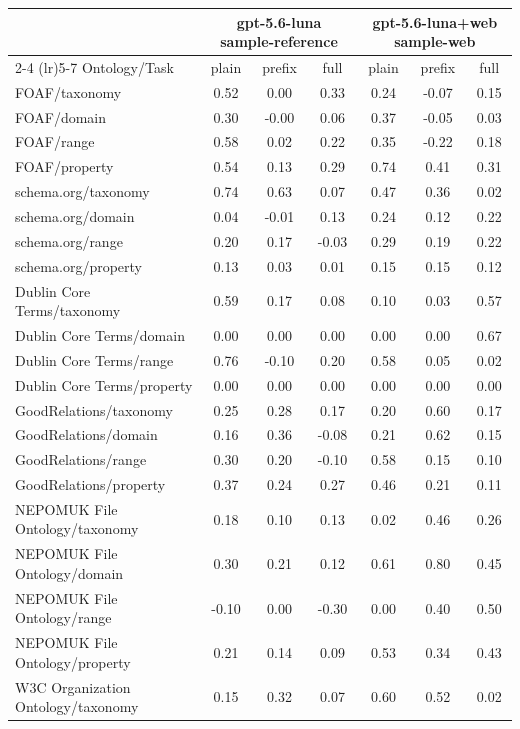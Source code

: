 \begin{tabular}{lcccccc}
\toprule
 & \multicolumn{3}{c}{gpt-5.6-luna sample-reference} & \multicolumn{3}{c}{gpt-5.6-luna+web sample-web} \\
\cmidrule(lr){2-4} \cmidrule(lr){5-7}
Ontology/Task & plain & prefix & full & plain & prefix & full \\
\midrule
FOAF/taxonomy & 0.52 & 0.00 & 0.33 & 0.24 & -0.07 & 0.15 \\
FOAF/domain & 0.30 & -0.00 & 0.06 & 0.37 & -0.05 & 0.03 \\
FOAF/range & 0.58 & 0.02 & 0.22 & 0.35 & -0.22 & 0.18 \\
FOAF/property & 0.54 & 0.13 & 0.29 & 0.74 & 0.41 & 0.31 \\
schema.org/taxonomy & 0.74 & 0.63 & 0.07 & 0.47 & 0.36 & 0.02 \\
schema.org/domain & 0.04 & -0.01 & 0.13 & 0.24 & 0.12 & 0.22 \\
schema.org/range & 0.20 & 0.17 & -0.03 & 0.29 & 0.19 & 0.22 \\
schema.org/property & 0.13 & 0.03 & 0.01 & 0.15 & 0.15 & 0.12 \\
Dublin Core Terms/taxonomy & 0.59 & 0.17 & 0.08 & 0.10 & 0.03 & 0.57 \\
Dublin Core Terms/domain & 0.00 & 0.00 & 0.00 & 0.00 & 0.00 & 0.67 \\
Dublin Core Terms/range & 0.76 & -0.10 & 0.20 & 0.58 & 0.05 & 0.02 \\
Dublin Core Terms/property & 0.00 & 0.00 & 0.00 & 0.00 & 0.00 & 0.00 \\
GoodRelations/taxonomy & 0.25 & 0.28 & 0.17 & 0.20 & 0.60 & 0.17 \\
GoodRelations/domain & 0.16 & 0.36 & -0.08 & 0.21 & 0.62 & 0.15 \\
GoodRelations/range & 0.30 & 0.20 & -0.10 & 0.58 & 0.15 & 0.10 \\
GoodRelations/property & 0.37 & 0.24 & 0.27 & 0.46 & 0.21 & 0.11 \\
NEPOMUK File Ontology/taxonomy & 0.18 & 0.10 & 0.13 & 0.02 & 0.46 & 0.26 \\
NEPOMUK File Ontology/domain & 0.30 & 0.21 & 0.12 & 0.61 & 0.80 & 0.45 \\
NEPOMUK File Ontology/range & -0.10 & 0.00 & -0.30 & 0.00 & 0.40 & 0.50 \\
NEPOMUK File Ontology/property & 0.21 & 0.14 & 0.09 & 0.53 & 0.34 & 0.43 \\
W3C Organization Ontology/taxonomy & 0.15 & 0.32 & 0.07 & 0.60 & 0.52 & 0.02 \\

\end{tabular}
